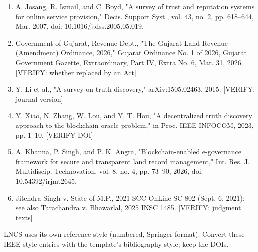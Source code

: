 \documentclass[10pt]{article}
\begin{document}
\begin{enumerate}
\item A. Josang, R. Ismail, and C. Boyd, "A survey of trust and reputation systems for online service provision," Decis. Support Syst., vol. 43, no. 2, pp. 618–644, Mar. 2007, doi: 10.1016/j.dss.2005.05.019.
\item Government of Gujarat, Revenue Dept., "The Gujarat Land Revenue (Amendment) Ordinance, 2026," Gujarat Ordinance No. 1 of 2026, Gujarat Government Gazette, Extraordinary, Part IV, Extra No. 6, Mar. 31, 2026. [VERIFY: whether replaced by an Act]
\item Y. Li et al., "A survey on truth discovery," arXiv:1505.02463, 2015. [VERIFY: journal version]
\item Y. Xiao, N. Zhang, W. Lou, and Y. T. Hou, "A decentralized truth discovery approach to the blockchain oracle problem," in Proc. IEEE INFOCOM, 2023, pp. 1–10. [VERIFY DOI]
\item A. Khanna, P. Singh, and P. K. Angra, "Blockchain-enabled e-governance framework for secure and transparent land record management," Int. Res. J. Multidiscip. Technovation, vol. 8, no. 4, pp. 73–90, 2026, doi: 10.54392/irjmt2645.
\item Jitendra Singh v. State of M.P., 2021 SCC OnLine SC 802 (Sept. 6, 2021); see also Tarachandra v. Bhawarlal, 2025 INSC 1485. [VERIFY: judgment texts]
\end{enumerate}
LNCS uses its own reference style (numbered, Springer format). Convert these IEEE-style entries with the template's bibliography style; keep the DOIs.
\end{document}
